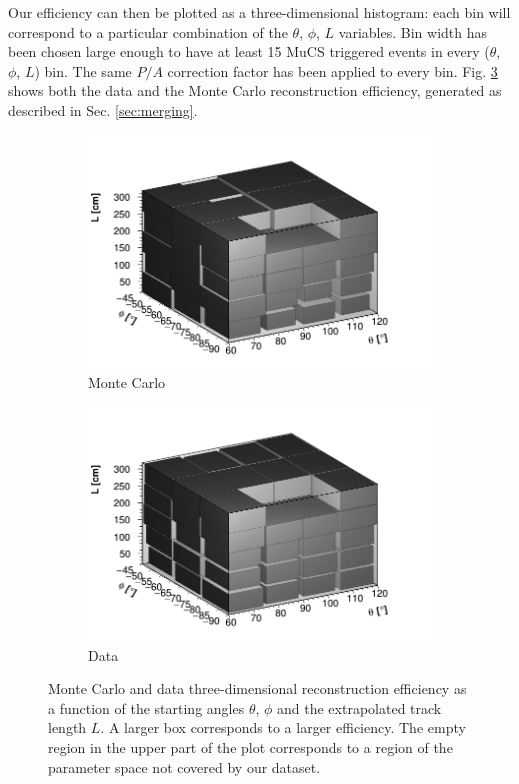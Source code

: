 \documentclass[a4paper]{scrartcl}
\begin{document}
Our efficiency can then be plotted as a three-dimensional histogram: each bin will correspond to a particular combination of the $\theta$, $\phi$, $L$ variables. Bin width has been chosen large enough to have at least 15 MuCS triggered events in every ($\theta$, $\phi$, $L$) bin. The same $P/A$ correction factor has been applied to every bin. Fig. \ref{fig:3d} shows both the data and the Monte Carlo reconstruction efficiency, generated as described in Sec. \ref{sec:merging}.

\begin{figure}[htbp]
  \begin{subfigure}{0.52\textwidth}
    \includegraphics[width=\linewidth]{figures/3d_mc.png}
    \caption{Monte Carlo} \label{fig:3d_mc}
  \end{subfigure}
  \begin{subfigure}{0.52\textwidth}
    \includegraphics[width=\linewidth]{figures/3d_data.png}
    \caption{Data} \label{fig:3d_data}
  \end{subfigure}
  \caption{Monte Carlo and data three-dimensional reconstruction efficiency as a function of the starting angles $\theta$, $\phi$ and the extrapolated track length $L$. A larger box corresponds to a larger efficiency. The empty region in the upper part of the plot corresponds to a region of the parameter space not covered by our dataset.}\label{fig:3d}
\end{figure}
\end{document}
